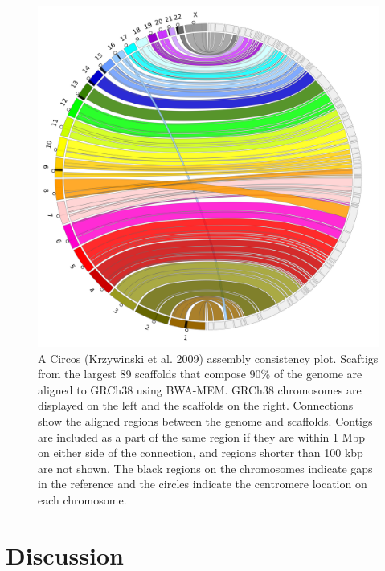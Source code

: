 \documentclass[
  12pt,
  oneside,
  openany]{book}
\begin{document}
\begin{figure}
\hypertarget{fig:jupiter}{%
\centering
\includegraphics{abyss2/abyss2_bionano_arcs.png}
\caption[A Circos (Krzywinski et al. 2009) assembly consistency plot.]{A Circos (Krzywinski et al. 2009) assembly consistency plot. Scaftigs from the largest 89 scaffolds that compose 90\% of the genome are aligned to GRCh38 using BWA-MEM. GRCh38 chromosomes are displayed on the left and the scaffolds on the right. Connections show the aligned regions between the genome and scaffolds. Contigs are included as a part of the same region if they are within 1 Mbp on either side of the connection, and regions shorter than 100 kbp are not shown. The black regions on the chromosomes indicate gaps in the reference and the circles indicate the centromere location on each chromosome.}\label{fig:jupiter}
}
\end{figure}

\hypertarget{discussion}{%
\section{Discussion}\label{discussion}}
\end{document}
